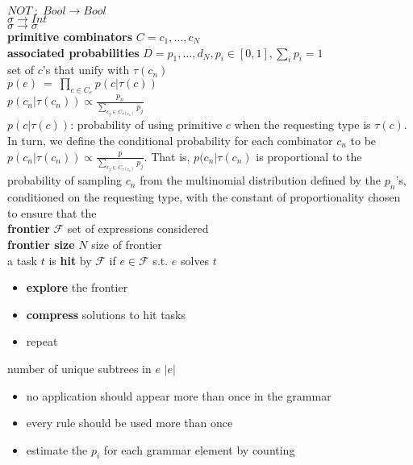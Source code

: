 \documentclass{article}
\begin{document}
$NOT \; : \; Bool \rightarrow Bool$\\

$\sigma \rightarrow Int$\\

$\sigma \rightarrow \sigma$\\


\textbf{primitive combinators } $C = c_1, \dots, c_N$\\

\textbf{associated probabilities } $D = p_1, \dots, d_N, p_i \in [0,1], \sum_i p_i = 1$\\

set of $c$'s that unify with $\tau(c_n)$\\


${ p(e)~=~\prod_{c \in C_e} p(c | \tau(c)) }$\\

$p(c_n| \tau(c_n)) \propto
\frac{p_n}{\sum_{c_j \in C_{\tau(c_n)}} p_j}$\\

$p(c | \tau(c))$: probability of using primitive $c$ when
the requesting type is $\tau(c)$. In turn, we define the conditional
probability for each combinator $c_n$ to be $p(c_n| \tau(c_n)) \propto
\frac{p}{\sum_{c_j \in C_{\tau(c_n)}} p_j}$.  That is, $p(c_n | \tau(c_n)$ is
proportional to the probability of sampling $c_n$ from the multinomial
distribution defined by the $p_n$'s, conditioned on the requesting
type, with the constant of proportionality chosen to ensure that the\\

\textbf{frontier} $\mathcal{F}$ set of expressions considered\\

\textbf{frontier size} $N$ size of frontier\\

a task $t$ is \textbf{hit} by $\mathcal{F}$ if $e \in \mathcal{F}$ s.t. $e$ solves $t$\\

\begin{itemize}
\item \textbf{explore} the frontier
\item \textbf{compress} solutions to hit tasks
\item repeat
\end{itemize}

number of unique subtrees in $e$\; $| e |$\\

\begin{itemize}
\item no application should appear more than once in the grammar
\item every rule should be used more than once
\item estimate the $p_i$ for each grammar element by counting
\end{itemize}
 







 
\end{document}
